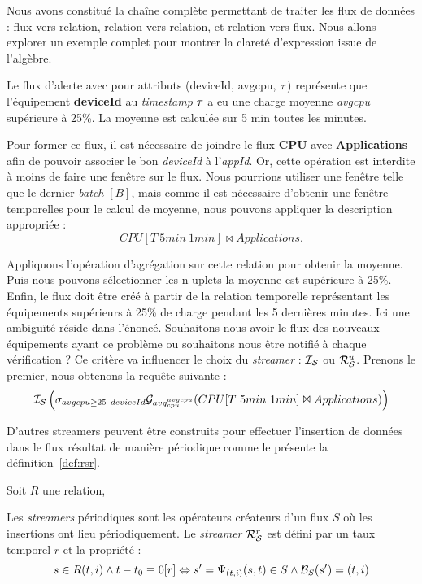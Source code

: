 Nous avons constitué la chaîne complète permettant de traiter les flux de données : flux vers relation, relation vers relation, et relation vers flux. Nous allons explorer un exemple complet pour montrer la clareté d'expression issue de l'algèbre.

\begin{example}
    Le flux d'alerte avec pour attributs (deviceId, avgcpu, $\tau$) représente que l'équipement \textbf{deviceId} au \textit{timestamp} $\tau$ a eu une charge moyenne \textit{avgcpu} supérieure à 25\%. La moyenne est calculée sur 5 min toutes les minutes.

    Pour former ce flux, il est nécessaire de joindre le flux \textbf{CPU} avec \textbf{Applications} afin de pouvoir associer le bon \textit{deviceId} à l'\textit{appId}. Or, cette opération est interdite à moins de faire une fenêtre sur le flux. Nous pourrions utiliser une fenêtre telle que le dernier \textit{batch} $[B]$, mais comme il est nécessaire d'obtenir une fenêtre temporelles pour le calcul de moyenne, nous pouvons appliquer la description appropriée : $$CPU[T\ 5min\ 1min]\Join Applications.$$

    Appliquons l'opération d'agrégation sur cette relation pour obtenir la moyenne. Puis nous pouvons sélectionner les n-uplets la moyenne est supérieure à 25\%. Enfin, le flux doit être créé à partir de la relation temporelle représentant les équipements supérieurs à 25\% de charge pendant les 5 dernières minutes. Ici une ambiguïté réside dans l'énoncé. Souhaitons-nous avoir le flux des nouveaux équipements ayant ce problème ou souhaitons nous être notifié à chaque vérification ? Ce critère va influencer le choix du \textit{streamer} : $\mathcal{I_S}$ ou $\mathcal{R}_{\mathcal S}^{u}$. Prenons le premier, nous obtenons la requête suivante : 
    $$\IS\left(\sigma_{avgcpu \geq 25} \ \null_{deviceId}\G_{avg_{cpu}^{avgcpu}} (CPU[T\ 5min\ 1min]\Join Applications)\right)$$
\end{example}

D'autres streamers peuvent être construits pour effectuer l'insertion de données dans le flux résultat de manière périodique comme le présente la définition~\ref{def:rsr}.
\begin{defi}\label{def:rsr}
    Soit $R$ une relation,

    Les \textit{streamers} périodiques sont les opérateurs créateurs d'un flux $S$ où les insertions ont lieu périodiquement. Le \textit{streamer} $\mathcal{R}_{\mathcal S}^{r}$ est défini par un taux temporel $r$ et la propriété :
$$s\in R(t,i) \wedge t-t_0\equiv 0[r]\Leftrightarrow s'=\Psi_{(t,i)}(s,t)\in S \wedge \mathcal{B}_S(s') = (t,i)$$
\end{defi}

